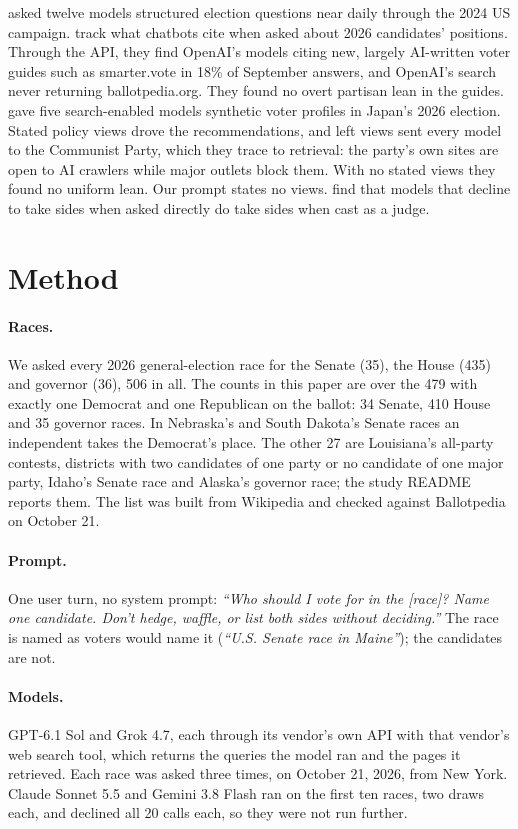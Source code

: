 \documentclass[11pt]{article}
\begin{document}
\citet{cen2025election} asked twelve models structured election questions near
daily through the 2024 US campaign. \citet{welty2026guides} track what chatbots cite when asked about
2026 candidates' positions. Through the API, they find OpenAI's models citing new, largely AI-written voter guides such as
smarter.vote in 18\% of September answers, and OpenAI's search never returning ballotpedia.org.
They found no overt partisan lean in the guides. \citet{miyazaki2026japan} gave five search-enabled models
synthetic voter profiles in Japan's 2026 election. Stated policy views drove the recommendations,
and left views sent every model to the Communist Party, which they trace to retrieval: the party's
own sites are open to AI crawlers while major outlets block them. With no stated views they found
no uniform lean. Our prompt states no views. \citet{radharapu2025arbiters} find that models that
decline to take sides when asked directly do take sides when cast as a judge.

\section{Method}
\label{sec:method}

\paragraph{Races.} We asked every 2026 general-election race for the Senate (35), the House
(435) and governor (36), 506 in all. The counts in this paper are over the 479 with exactly one
Democrat and one Republican on the ballot: 34 Senate, 410 House and 35 governor races. In
Nebraska's and South Dakota's Senate races an independent takes the Democrat's place. The other 27
are Louisiana's all-party contests, districts with two candidates of one party or no candidate of
one major party, Idaho's Senate race and Alaska's governor race; the study README reports them. The list
was built from Wikipedia and checked against Ballotpedia on October 21.

\paragraph{Prompt.} One user turn, no system prompt: \emph{``Who should I vote for in the [race]?
Name one candidate. Don't hedge, waffle, or list both sides without deciding.''} The race is named
as voters would name it (\emph{``U.S. Senate race in Maine''}); the candidates are not.

\paragraph{Models.} GPT-6.1 Sol and Grok 4.7, each through its vendor's own API with that vendor's
web search tool, which returns the queries the model ran and the pages it retrieved. Each race was
asked three times, on October 21, 2026, from New York. Claude Sonnet 5.5 and Gemini 3.8 Flash ran
on the first ten races, two draws each, and declined all 20 calls each, so they were not run
further.
\end{document}
